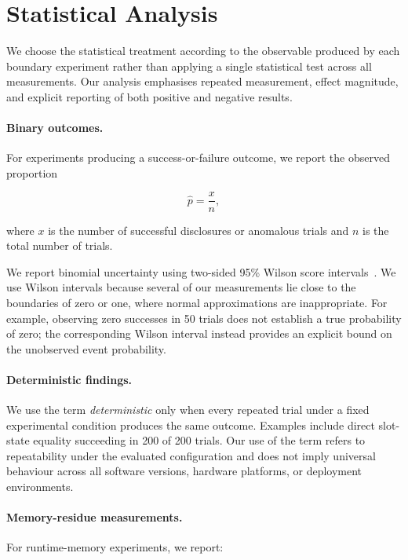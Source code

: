 \section{Statistical Analysis}
\label{app:statistics}

We choose the statistical treatment according to the observable produced
by each boundary experiment rather than applying a single statistical
test across all measurements. Our analysis emphasises repeated
measurement, effect magnitude, and explicit reporting of both positive
and negative results.

\paragraph{Binary outcomes.}
For experiments producing a success-or-failure outcome, we report the
observed proportion

\[
\hat{p}=\frac{x}{n},
\]

where \(x\) is the number of successful disclosures or anomalous trials
and \(n\) is the total number of trials.

We report binomial uncertainty using two-sided 95\% Wilson score
intervals~\cite{wilson1927}. We use Wilson intervals because several of
our measurements lie close to the boundaries of zero or one, where
normal approximations are inappropriate. For example, observing zero
successes in 50 trials does not establish a true probability of zero;
the corresponding Wilson interval instead provides an explicit bound on
the unobserved event probability.

\paragraph{Deterministic findings.}
We use the term \emph{deterministic} only when every repeated trial under
a fixed experimental condition produces the same outcome. Examples
include direct slot-state equality succeeding in 200 of 200 trials. Our use of
the term refers to repeatability under the evaluated configuration and
does not imply universal behaviour across all software versions,
hardware platforms, or deployment environments.

\paragraph{Memory-residue measurements.}
For runtime-memory experiments, we report:

